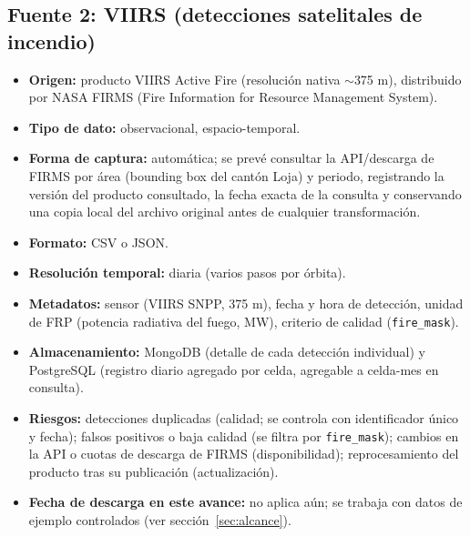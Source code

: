\documentclass[11pt,a4paper]{article}
\begin{document}
\subsection{Fuente 2: VIIRS (detecciones satelitales de incendio)}
\begin{itemize}
    \item \textbf{Origen:} producto VIIRS Active Fire (resoluci\'on nativa $\sim$375 m), distribuido por NASA FIRMS (Fire Information for Resource Management System).
    \item \textbf{Tipo de dato:} observacional, espacio-temporal.
    \item \textbf{Forma de captura:} autom\'atica; se prev\'e consultar la API/descarga de FIRMS por \'area (bounding box del cant\'on Loja) y periodo, registrando la versi\'on del producto consultado, la fecha exacta de la consulta y conservando una copia local del archivo original antes de cualquier transformaci\'on.
    \item \textbf{Formato:} CSV o JSON.
    \item \textbf{Resoluci\'on temporal:} diaria (varios pasos por \'orbita).
    \item \textbf{Metadatos:} sensor (VIIRS SNPP, 375 m), fecha y hora de detecci\'on, unidad de FRP (potencia radiativa del fuego, MW), criterio de calidad (\texttt{fire\_mask}).
    \item \textbf{Almacenamiento:} MongoDB (detalle de cada detecci\'on individual) y PostgreSQL (registro diario agregado por celda, agregable a celda-mes en consulta).
    \item \textbf{Riesgos:} detecciones duplicadas (calidad; se controla con identificador \'unico y fecha); falsos positivos o baja calidad (se filtra por \texttt{fire\_mask}); cambios en la API o cuotas de descarga de FIRMS (disponibilidad); reprocesamiento del producto tras su publicaci\'on (actualizaci\'on).
    \item \textbf{Fecha de descarga en este avance:} no aplica a\'un; se trabaja con datos de ejemplo controlados (ver secci\'on~\ref{sec:alcance}).
\end{itemize}
\end{document}
